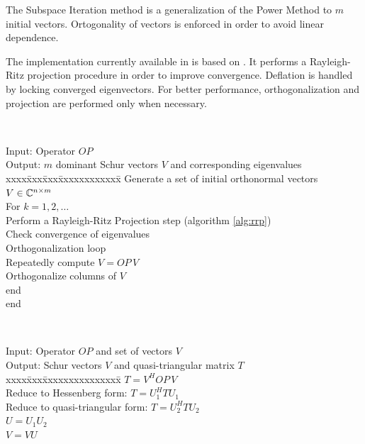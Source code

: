 The Subspace Iteration method is a generalization of the Power Method to $m$ initial vectors. Ortogonality of vectors is enforced in order to avoid linear dependence.

The implementation currently available in \slepc is based on \srrit \citep{Bai:1997:ASF}. It performs a Rayleigh-Ritz projection procedure in order to improve convergence. Deflation is handled by locking converged eigenvectors. For better performance, orthogonalization and projection are performed only when necessary.

\begin{algorithm}~\rm
\begin{tabbing}
Input: Operator $O\!P$ \\
Output: $m$ dominant Schur vectors $V$ and corresponding eigenvalues\\
xxxx\=xxx\=xxx\=xxxxxxxxxxxx\=\kill
\> Generate a set of initial orthonormal vectors $V\in\mathbb{C}^{n\times m}$\\
\> For $k=1,2,\ldots$\\
\> \> Perform a Rayleigh-Ritz Projection step (algorithm \ref{alg:rrp})\\
\> \> Check convergence of eigenvalues \\
\> \> Orthogonalization loop \\
\> \> \> Repeatedly compute $V = O\!P\, V$ \\
\> \> \> Orthogonalize columns of $V$ \\
\> \> end \\
\> end
\end{tabbing}
\end{algorithm}

\begin{algorithm}~\rm
\begin{tabbing}
Input: Operator $O\!P$ and set of vectors $V$\\
Output: Schur vectors $V$ and quasi-triangular matrix $T$ \\
xxxx\=xxx\=xxxxxxxxxxxxxxx\=\kill
\> $T=V^H O\!P\, V$ \\
\> Reduce to Hessenberg form: $T=U_1^HTU_1$ \\
\> Reduce to quasi-triangular form: $T=U_2^HTU_2$ \\
\> $U=U_1U_2$ \\
\> $V=VU$ 
\end{tabbing}
\end{algorithm}

